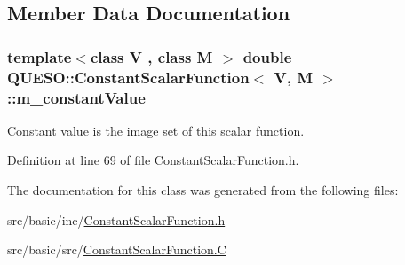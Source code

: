 \subsection{Member Data Documentation}
\hypertarget{class_q_u_e_s_o_1_1_constant_scalar_function_a97eaa01d6fadadbe6f8e6c484b2f5f28}{
\subsubsection[{m\-\_\-constant\-Value}]{\setlength{\rightskip}{0pt plus 5cm}template$<$class V , class M $>$ double {\bf Q\-U\-E\-S\-O\-::\-Constant\-Scalar\-Function}$<$ V, M $>$\-::m\-\_\-constant\-Value\hspace{0.3cm}{\ttfamily [protected]}}}\label{class_q_u_e_s_o_1_1_constant_scalar_function_a97eaa01d6fadadbe6f8e6c484b2f5f28}


Constant value is the image set of this scalar function. 



Definition at line 69 of file Constant\-Scalar\-Function.\-h.



The documentation for this class was generated from the following files\-:\begin{DoxyCompactItemize}
\item 
src/basic/inc/\hyperlink{_constant_scalar_function_8h}{Constant\-Scalar\-Function.\-h}\item 
src/basic/src/\hyperlink{_constant_scalar_function_8_c}{Constant\-Scalar\-Function.\-C}\end{DoxyCompactItemize}
